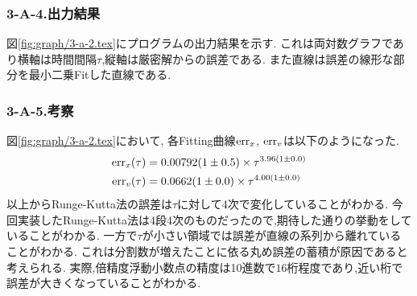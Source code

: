 \subsubsection*{3-A-4.出力結果}
図\ref{fig:graph/3-a-2.tex}にプログラムの出力結果を示す.
これは両対数グラフであり横軸は時間間隔$\tau$,縦軸は厳密解からの誤差である.
また直線は誤差の線形な部分を最小二乗Fitした直線である.
\subsubsection*{3-A-5.考察}
図\ref{fig:graph/3-a-2.tex}において,
各Fitting曲線${\rm err}_x$, ${\rm err}_v$は以下のようになった.
\begin{align}
  {\rm err}_x(\tau)&=0.00792(1\pm0.5)\times \tau^{3.96(1\pm0.0)}\\
  {\rm err}_v(\tau)&=0.0662(1\pm0.0)\times \tau^{4.00(1\pm0.0)}
\end{align}
以上からRunge-Kutta法の誤差は$\tau$に対して4次で変化していることがわかる.
今回実装したRunge-Kutta法は4段4次のものだったので,期待した通りの挙動をしていることがわかる.
一方で$\tau$が小さい領域では誤差が直線の系列から離れていることがわかる.
これは分割数が増えたことに依る丸め誤差の蓄積が原因であると考えられる.
実際,倍精度浮動小数点の精度は10進数で$16$桁程度であり,近い桁で誤差が大きくなっていることがわかる.